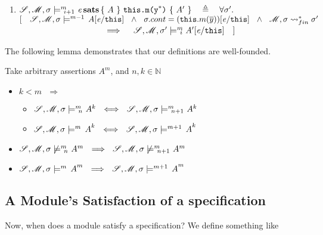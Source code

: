 \begin{definition}
\begin{enumerate}
\item
$ {\mathcal{S}}, {\mathcal M}, \sigma \models^{m} \!\!\!\!_{i+1} \ {\mathit{e}\, \textbf{sats} \, \{ \ A  \ \} \   \mbox{\normalfont{\texttt{this.m(y}}}^*\mbox{\normalfont{\texttt{)}}} \  \{ \  A'  \ \} }
 \ \ \ \triangleq \ \ \
 \forall \sigma'. $\\
$ [ \  \  \ \satM   {\sigma} {m-1}  {A[\re/\prg{this}]}\ \ \wedge\ \  \sigma.cont=(\prg{this}.m(\overline y))[\re/\prg{this}] \ \ \wedge\ \
\Mod, \sigma\leadsto^*_{fin} \sigma'  $\\
$\strut \hspace{3cm} \hfill \ \   \ \  \  \Longrightarrow\ \ \ \  \satMN  {\sigma'} m {i}  {A'[\re/\prg{this}] }\ \ \ ]$

\end{enumerate}

 \end{definition} 
 
 The following lemma demonstrates that our definitions are well-founded.
 
 \begin{lemma}
Take arbitrary assertions $A^m$, and $n, k\in \mathbb{N}$ 

\begin{itemize}
\item
$k<m\ \ \ \Longrightarrow$
\begin{itemize}
\item
$\satMN  \sigma m n   A^k\ \ \Longleftrightarrow\ \ \satMN  \sigma m {n+1}   A^k$
\item
$\satM    \sigma m    A^k\ \ \Longleftrightarrow\ \ \satM   \sigma {m+1}   A^k$
\end{itemize}
\item
$\notsatMN    \sigma m  n  A^m\ \ \Longrightarrow\ \ \notsatMN   \sigma m {n+1}  A^m$
\item
$\satM   \sigma m   A^m\ \ \Longrightarrow\ \ \satM    \sigma {m+1}  A^m$

\end{itemize}
\end{lemma}
 
 \subsection{A Module's Satisfaction of a specification}
 Now, when does a module satisfy a specification? We define something like
 
